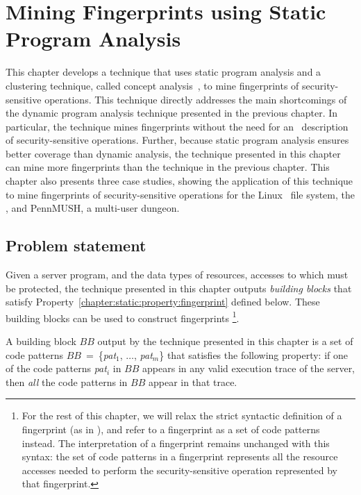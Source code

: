 \chapter{Mining Fingerprints using Static Program Analysis}
\label{chapter:static}

This chapter develops a technique that uses static program analysis and a
clustering technique, called concept analysis~\cite{w82}, to mine fingerprints
of security-sensitive operations. This technique directly addresses the main
shortcomings of the dynamic program analysis technique presented in the
previous chapter. In particular, the technique mines fingerprints without
the need for an \apriori\ description of security-sensitive operations.
Further, because static program analysis ensures better coverage than dynamic
analysis, the technique presented in this chapter can mine more fingerprints 
than the technique in the previous chapter. This chapter also presents three
case studies, showing the application of this technique to mine fingerprints
of security-sensitive operations for the Linux \ext\ file system, the \xserver,
and PennMUSH, a multi-user dungeon. 

\section{Problem statement} 
\label{chapter:static:problem}

Given a server program, and the data types of resources, accesses to which must
be protected, the technique presented in this chapter outputs \textit{building
blocks} that satisfy Property~\ref{chapter:static:property:fingerprint} defined
below. These building blocks can be used to construct fingerprints
\footnote{For the rest of this chapter, we will relax the strict syntactic
definition of a fingerprint (as in ), and
refer to a fingerprint as a set of code patterns instead. The interpretation of
a fingerprint remains unchanged with this syntax: the set of code patterns in a
fingerprint represents all the resource accesses needed to perform the
security-sensitive operation represented by that fingerprint.}.

\begin{property}
%
A building block $BB$ output by the technique presented in this chapter is a
set of code patterns $BB$~=~\{\textit{pat$_1$}, $\ldots$, \textit{pat$_m$}\}
that satisfies the following property: if one of the code patterns
\textit{pat$_i$} in $BB$ appears in any valid execution trace of the server,
then \textit{all} the code patterns in $BB$ appear in that trace.
%
\label{chapter:static:property:fingerprint}
%
\end{property}

